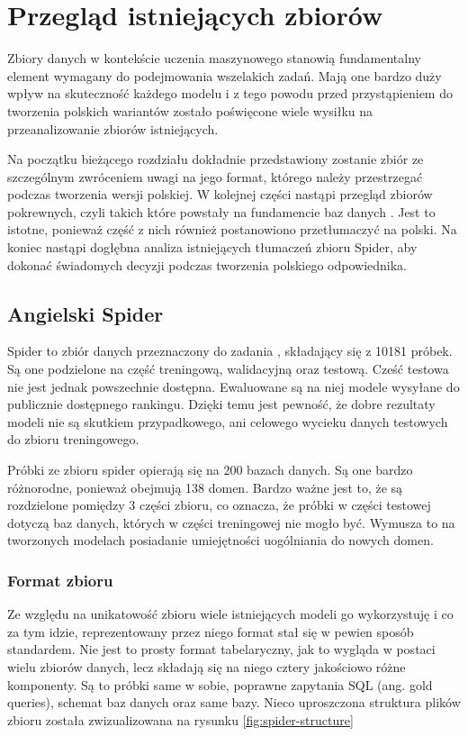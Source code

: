 \chapter{Przegląd istniejących zbiorów}
Zbiory danych w kontekście uczenia maszynowego stanowią fundamentalny element wymagany do podejmowania wszelakich zadań. Mają one bardzo duży wpływ na skuteczność każdego modelu i z tego powodu przed przystąpieniem do tworzenia polskich wariantów zostało poświęcone wiele wysiłku na przeanalizowanie zbiorów istniejących.

Na początku bieżącego rozdziału dokładnie przedstawiony zostanie zbiór  ze szczególnym zwróceniem uwagi na jego format, którego należy przestrzegać podczas tworzenia wersji polskiej. W kolejnej części nastąpi przegląd zbiorów pokrewnych, czyli takich które powstały na fundamencie baz danych . Jest to istotne, ponieważ część z nich również postanowiono przetłumaczyć na polski. Na koniec nastąpi dogłębna analiza istniejących tłumaczeń zbioru Spider, aby dokonać świadomych decyzji podczas tworzenia polskiego odpowiednika.

\section{Angielski Spider}
Spider to zbiór danych przeznaczony do zadania , składający się z 10181 próbek. Są one podzielone na część treningową, walidacyjną oraz testową. Cześć testowa nie jest jednak powszechnie dostępna. Ewaluowane są na niej modele wysyłane do publicznie dostępnego rankingu. Dzięki temu jest pewność, że dobre rezultaty modeli nie są skutkiem przypadkowego, ani celowego wycieku danych testowych do zbioru treningowego.

Próbki ze zbioru spider opierają się na 200 bazach danych. Są one bardzo różnorodne, ponieważ obejmują 138 domen. Bardzo ważne jest to, że są rozdzielone pomiędzy 3 części zbioru, co oznacza, że próbki w części testowej dotyczą baz danych, których w części treningowej nie mogło być. Wymusza to na tworzonych modelach posiadanie umiejętności uogólniania do nowych domen.

\subsection{Format zbioru}

Ze względu na unikatowość zbioru  wiele istniejących modeli go wykorzystuję i co za tym idzie, reprezentowany przez niego format stał się w pewien sposób standardem. Nie jest to prosty format tabelaryczny, jak to wygląda w postaci wielu zbiorów danych, lecz składają się na niego cztery jakościowo różne komponenty. Są to próbki same w sobie, poprawne zapytania SQL (ang. gold queries), schemat baz danych oraz same bazy. Nieco uproszczona struktura plików zbioru została zwizualizowana na rysunku \ref{fig:spider-structure} 

